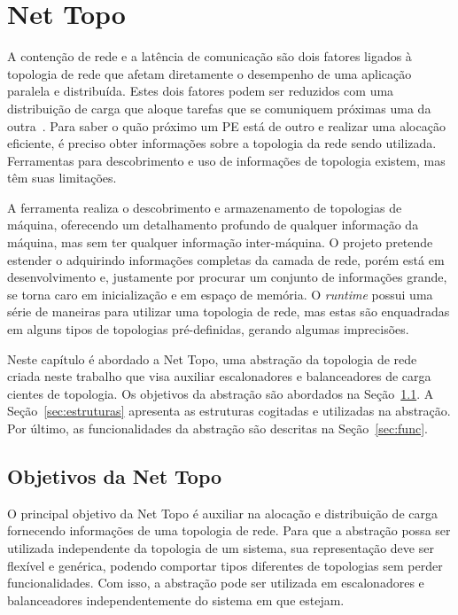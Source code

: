 \chapter{Net Topo}
\label{cap:proposta}

A contenção de rede e a latência de comunicação são dois fatores ligados à topologia de rede que afetam diretamente o desempenho de uma aplicação paralela e distribuída.
Estes dois fatores podem ser reduzidos com uma distribuição de carga que aloque tarefas que se comuniquem próximas uma da outra~\cite{bhatele-encyclopedia}.
Para saber o quão próximo um PE está de outro e realizar uma alocação eficiente, é preciso obter informações sobre a topologia da rede sendo utilizada.
Ferramentas para descobrimento e uso de informações de topologia existem, mas têm suas limitações.

A ferramenta \hwloc realiza o descobrimento e armazenamento de topologias de máquina, oferecendo um detalhamento profundo de qualquer informação da máquina, mas sem ter qualquer informação inter-máquina.
O projeto \netloc pretende estender o \hwloc adquirindo informações completas da camada de rede, porém está em desenvolvimento e, justamente por procurar um conjunto de informações grande, se torna caro em inicialização e em espaço de memória.
O \textit{runtime} \charm possui uma série de maneiras para utilizar uma topologia de rede, mas estas são enquadradas em alguns tipos de topologias pré-definidas, gerando algumas imprecisões.

Neste capítulo é abordado a Net Topo, uma abstração da topologia de rede criada neste trabalho que visa auxiliar escalonadores e balanceadores de carga cientes de topologia. 
Os objetivos da abstração são abordados na Seção~\ref{sec:net_objetivos}.
A Seção~\ref{sec:estruturas} apresenta as estruturas cogitadas e utilizadas na abstração.
Por último, as funcionalidades da abstração são descritas na Seção~\ref{sec:func}.

\section{Objetivos da Net Topo}
\label{sec:net_objetivos}

O principal objetivo da Net Topo é auxiliar na alocação e distribuição de carga fornecendo informações de uma topologia de rede.
Para que a abstração possa ser utilizada independente da topologia de um sistema, sua representação deve ser flexível e genérica, podendo comportar tipos diferentes de topologias sem perder funcionalidades.
Com isso, a abstração pode ser utilizada em escalonadores e balanceadores independentemente do sistema em que estejam.

